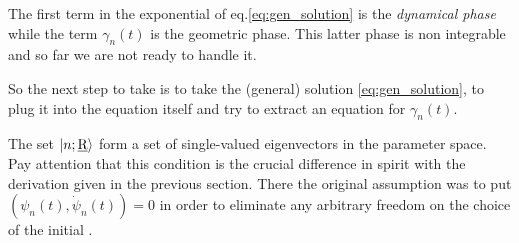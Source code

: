 The first term in the exponential of eq.\eqref{eq:gen_solution} is the \emph{dynamical phase} while the term $ \gamma_n(t) $ is the geometric phase. This latter phase is non integrable and so far we are not ready to handle it.

So the next step to take is to take the (general) solution \eqref{eq:gen_solution}, to plug it into the \Sch equation itself and try to extract an equation for $ \gamma_n(t) $.
%
%
%
\begin{rem}
	The set $ \Ket{n;\underline{\textrm{R}}} $ form a set of single-valued eigenvectors in the parameter space. Pay attention that this condition is the crucial difference in spirit with the derivation given in the previous section. There the original assumption was to put $ \left(\psi_n(t),\dot{\psi}_n(t) \right)=0 $ in order to eliminate any arbitrary freedom on the choice of the initial \wf.
\end{rem}


